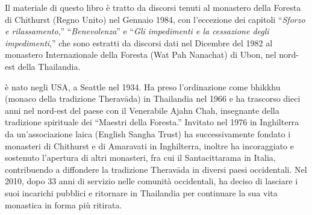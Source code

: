 
{\centering\par
\Large\scshape\chapTitleFont\thetitle
\par}
\vspace*{2\baselineskip}

{%
\setlength{\parskip}{1.5em}
\setlength{\parindent}{0pt}

Il materiale di questo libro è tratto da discorsi tenuti al monastero della Foresta di Chithurst (Regno Unito) nel Gennaio 1984, con l'eccezione dei capitoli ``\textit{Sforzo e rilassamento},'' ``\textit{Benevolenza}'' e ``\textit{Gli impedimenti e la cessazione degli impedimenti},'' che sono estratti da discorsi dati nel Dicembre del 1982 al monastero Internazionale della Foresta (Wat Pah Nanachat) di Ubon, nel nord-est della Thailandia.

%
%
%
%
%
%
%

\clearpage
\thispagestyle{empty}

{\scshape \theauthor} è nato negli USA, a Seattle nel 1934. Ha preso l'ordinazione come bhikkhu (monaco della tradizione Theravāda) in Thailandia nel 1966 e ha trascorso dieci anni nel nord-est del paese con il Venerabile Ajahn Chah, insegnante della tradizione spirituale dei ``Maestri della Foresta.'' Invitato nel 1976 in Inghilterra da un'associazione laica (English Sangha Trust) ha successivamente fondato i monasteri di Chithurst e di Amaravati in Inghilterra, inoltre ha incoraggiato e sostenuto l'apertura di altri monasteri, fra cui il Santacittarama in Italia, contribuendo a diffondere la tradizione Theravāda in diversi paesi occidentali. Nel 2010, dopo 33 anni di servizio nelle comunità occidentali, ha deciso di lasciare i suoi incarichi pubblici e ritornare in Thailandia per continuare la sua vita monastica in forma più ritirata.

}
